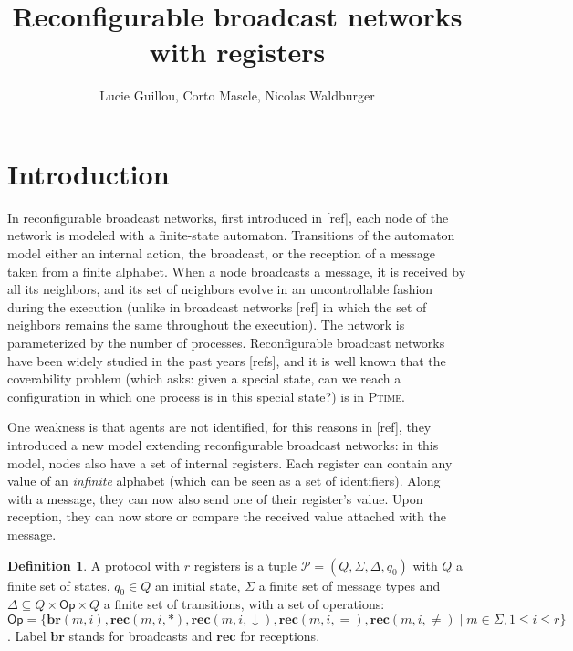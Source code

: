 \documentclass{article}
\title{Reconfigurable broadcast networks with registers}
\author{Lucie Guillou, Corto Mascle, Nicolas Waldburger}
\date{}
\newcommand{\set}[1]{\{#1\}}
\theoremstyle{definition}
\newtheorem{definition}[theorem]{Definition}
\begin{document}
	
	\maketitle
	
	\section{Introduction}
	
	
	
	In reconfigurable broadcast networks, first introduced in [ref], each node of the network is modeled with a finite-state automaton. Transitions of the automaton model either an internal action, the broadcast, or the reception of a message taken from a finite alphabet. When a node broadcasts a message, it is received by all its neighbors, and its set of neighbors evolve in an uncontrollable fashion during the execution (unlike in broadcast networks [ref] in which the set of neighbors remains the same throughout the execution). The network is parameterized by the number of processes. Reconfigurable broadcast networks have been widely studied in the past years [refs], and it is well known that the coverability problem (which asks: given a special state, can we reach a configuration in which one process is in this special state?) is in \textsc{Ptime}.
	
	One weakness is that agents are not identified, for this reasons in [ref], they introduced a new model extending reconfigurable broadcast networks: in this model, nodes also have a set of internal registers. Each register can contain any value of an \emph{infinite} alphabet (which can be seen as a set of identifiers). Along with a message, they can now also send one of their register's value. Upon reception, they can now store or compare the received value attached with the message.
	
	
	\begin{definition}
		A protocol with $r$ registers is a tuple $\mathcal{P} = (Q, \Sigma, \Delta, q_0)$  with $Q$ a finite set of states, $q_0 \in Q$ an initial state, $\Sigma$ a finite set of message types  and $\Delta \subseteq Q \times \mathsf{Op} \times Q$ a finite set of transitions, with a set of operations: $\mathsf{Op} = \set{\mathbf{br}(m,i), \mathbf{rec}(m,i, \ast), \mathbf{rec}(m,i, \downarrow), \mathbf{rec}(m,i, =),\mathbf{rec}(m,i, \neq) \mid m \in \Sigma, 1 \leq i \leq r}$.
		Label $\mathbf{br}$ stands for broadcasts and $\mathbf{rec}$ for receptions.
		
	\end{definition}
	
\end{document}
